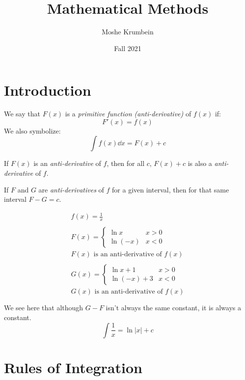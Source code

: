 \documentclass[00_complete]{subfiles}
\title{Mathematical Methods}
\author{Moshe Krumbein}
\date{Fall 2021}
\begin{document}

\section{Introduction}

\begin{definition}
    We say that $F(x)$ is a \emph{primitive function (anti-derivative)} of
    $f(x)$ if:
    $$F'(x)=f(x)$$
    We also symbolize:
    $$\boxed{\int f(x)\dd{x} = F(x) + c}$$
\end{definition}

\begin{theorem}
    If $F(x)$ is an \emph{anti-derivative} of $f$, then for all $c$, $F(x)+c$ is also
    a \emph{anti-derivative} of $f$.
\end{theorem}

\begin{theorem}
    If $F$ and $G$ are \emph{anti-derivatives} of $f$ for a given interval, then for
    that same interval $F-G=c$.
\end{theorem}

\begin{example}
    $$
    \begin{gathered}
        f(x)=\frac{1}{x} \\ \\
        F(x)=\begin{cases}
            \ln x & x>0 \\
            \ln(-x) & x<0
        \end{cases} \\
        F(x) \text{ is an anti-derivative of } f(x) \\ \\
        G(x) = \begin{cases}
            \ln x + 1 & x>0 \\
            \ln (-x) + 3 & x<0
        \end{cases} \\
        G(x) \text{ is an anti-derivative of } f(x) \\ \\
    \end{gathered}
    $$
    We see here that although $G-F$ isn't always the same constant, it is
    always a constant.
    $$\int \frac{1}{x} = \ln |x| + c$$
\end{example}

\section{Rules of Integration}
\end{document}
